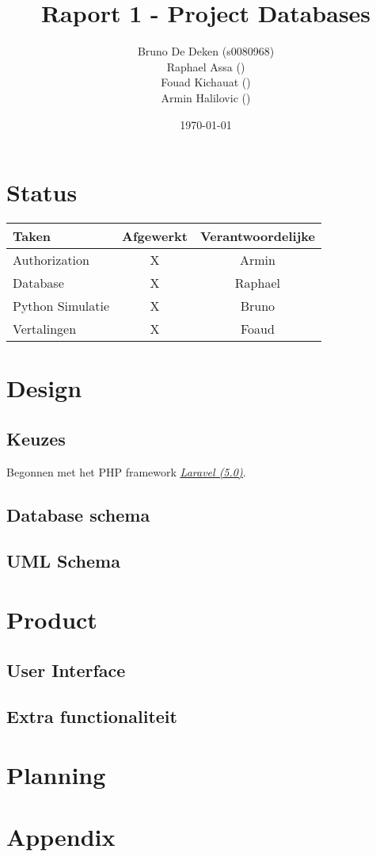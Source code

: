 \documentclass[12pt]{article}
\title{Raport 1 - Project Databases}
\author{
    Bruno De Deken (s0080968) \\
    Raphael Assa () \\
    Fouad Kichauat () \\
    Armin Halilovic ()
}
\date{\today}
\begin{document}
\maketitle

\section{Status}
\begin{tabular}{| l | c | c |}
    \hline
    Taken   &   Afgewerkt   &   Verantwoordelijke \\
    \hline \hline
    Authorization           &   X   &   Armin \\
    Database                &   X   &   Raphael \\
    Python Simulatie        &   X   &   Bruno \\
    Vertalingen             &   X   &   Foaud \\
    \hline
\end{tabular}

\section{Design}
\subsection{Keuzes}
Begonnen met het PHP framework \href{http://laravel.com/}{\underline{\emph{Laravel (5.0)}}}.
\subsection{Database schema}
\subsection{UML Schema}

\section{Product}
\subsection{User Interface}
\subsection{Extra functionaliteit}

\section{Planning}
\section{Appendix}
\end{document}
